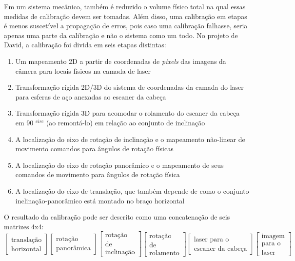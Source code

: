 Em um sistema mecânico, também é reduzido o volume físico total na qual essas medidas de calibração devem ser tomadas. Além disso, uma calibração em etapas é menos suscetível a propagação de erros, pois caso uma calibração falhasse, seria apenas uma parte da calibração e não o sistema como um todo. No projeto de David, a calibração foi divida em seis etapas distintas:

\begin{enumerate}
\item{Um mapeamento 2D a partir de coordenadas de {\it pixels} das imagens da câmera para locais físicos na camada de laser}
\item{Transformação rígida 2D/3D do sistema de coordenadas da camada do laser para esferas de aço anexadas ao escaner da cabeça}
\item{Transformação rígida 3D para acomodar o rolamento do escaner da cabeça em 90 $^{circ}$ (ao remontá-lo) em relação ao conjunto de inclinação}
\item{A localização do eixo de rotação de inclinação e o mapeamento não-linear de movimento comandos para ângulos de rotação físicas}
\item{A localização do eixo de rotação panorâmico e o mapeamento de seus comandos de movimento para ângulos de rotação física}
\item{A localização do eixo de translação, que também depende de como o conjunto inclinação-panorâmico está montado no braço horizontal}
\end{enumerate}

O resultado da calibração pode ser descrito como uma concatenação de seis matrizes 4x4:
\[
\begin{bmatrix}
\text{translação} \\ 
\text{horizontal}
\end{bmatrix}
\begin{bmatrix}
\text{rotação} \\ 
\text{panorâmica}
\end{bmatrix}
\begin{bmatrix}
\text{rotação} \\
\text{de} \\
\text{inclinação}
\end{bmatrix}
\begin{bmatrix}
\text{rotação} \\
\text{de} \\
\text{rolamento}
\end{bmatrix}
\begin{bmatrix}
\text{laser para o} \\
\text{escaner }
\text{da cabeça}
\end{bmatrix}
\begin{bmatrix}
\text{imagem} \\
\text{para o} \\
\text{laser}
\end{bmatrix}
\]


